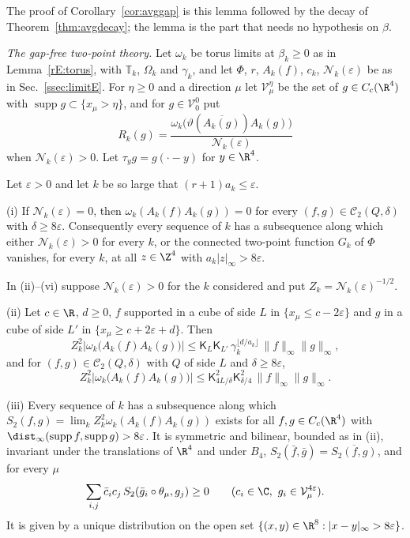 The proof of Corollary~\ref{cor:avggap} is this lemma followed by the
decay of Theorem~\ref{thm:avgdecay}; the lemma is the part that needs no
hypothesis on $\beta$.

\emph{The gap-free two-point theory.} Let $\omega_k$ be torus limits at
$\beta_k\ge0$ as in Lemma~\ref{rE:torus}, with $\mathbb T_k$, $\Omega_k$ and
$\gamma_k$, and let $\Phi$, $r$, $A_k(f)$, $c_k$, $\mathcal N_k(\varepsilon)$
be as in Sec.~\ref{ssec:limitE}. For $\eta\ge0$ and a direction $\mu$ let
$\mathcal V^\eta_\mu$ be the set of $g\in C_c(\R^4)$ with
$\operatorname{supp}g\subset\{x_\mu>\eta\}$, and for $g\in\mathcal V^0_0$
put
\[
R_k(g)=\frac{\omega_k\bigl(\vartheta(\overline{A_k(g)})A_k(g)\bigr)}
{\mathcal N_k(\varepsilon)}
\]
when $\mathcal N_k(\varepsilon)>0$. Let $\tau_yg=g(\cdot-y)$ for $y\in\R^4$.

\begin{theorem}
\label{rE:two}
Let $\varepsilon>0$ and let $k$ be so large that $(r+1)a_k\le\varepsilon$.

\textup{(i)} If $\mathcal N_k(\varepsilon)=0$, then $\omega_k(A_k(f)A_k(g))=0$
for every $(f,g)\in\mathcal C_2(Q,\delta)$ with $\delta\ge8\varepsilon$.
Consequently every sequence of $k$ has a subsequence along which either
$\mathcal N_k(\varepsilon)>0$ for every $k$, or the connected two-point
function $G_k$ of $\Phi$ vanishes, for every $k$, at all $z\in\Z^4$ with
$a_k|z|_\infty>8\varepsilon$.

In \textup{(ii)}--\textup{(vi)} suppose $\mathcal N_k(\varepsilon)>0$ for the
$k$ considered and put $Z_k=\mathcal N_k(\varepsilon)^{-1/2}$.

\textup{(ii)} Let $c\in\R$, $d\ge0$, $f$ supported in a cube of side $L$ in
$\{x_\mu\le c-2\varepsilon\}$ and $g$ in a cube of side $L'$ in
$\{x_\mu\ge c+2\varepsilon+d\}$. Then
\[
Z_k^2\bigl|\omega_k\bigl(A_k(f)A_k(g)\bigr)\bigr|\le\mathsf K_L\mathsf
K_{L'}\,\gamma_k^{\lfloor d/a_k\rfloor}\,\|f\|_\infty\|g\|_\infty ,
\]
and for $(f,g)\in\mathcal C_2(Q,\delta)$ with $Q$ of side $L$ and
$\delta\ge8\varepsilon$,
\[
Z_k^2\bigl|\omega_k\bigl(A_k(f)A_k(g)\bigr)\bigr|\le\mathsf K_{4L/\delta}^2
\mathsf K_{\delta/4}^2\,\|f\|_\infty\|g\|_\infty .
\]

\textup{(iii)} Every sequence of $k$ has a subsequence along which
$S_2(f,g)=\lim_kZ_k^2\omega_k(A_k(f)A_k(g))$ exists for all $f,g\in
C_c(\R^4)$ with $\dist_\infty(\operatorname{supp}f,\operatorname{supp}g)>
8\varepsilon$. It is symmetric and bilinear, bounded as in \textup{(ii)},
invariant under the translations of $\R^4$ and under $B_4$,
$S_2(\bar f,\bar g)=\overline{S_2(f,g)}$, and for every $\mu$
\[
\sum_{i,j}\bar c_ic_j\,S_2(\bar g_i\circ\theta_\mu,g_j)\ge0\qquad
(c_i\in\C,\ g_i\in\mathcal V^{4\varepsilon}_\mu).
\]
It is given by a unique distribution on the open set $\{(x,y)\in\R^8:
|x-y|_\infty>8\varepsilon\}$.


\end{theorem}

